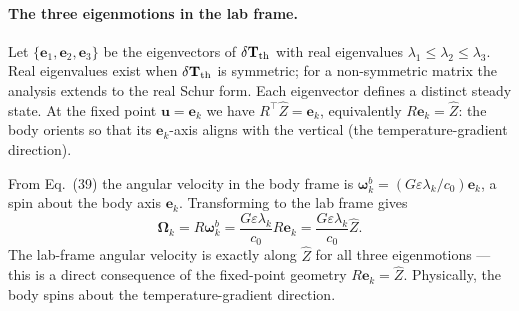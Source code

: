 \documentclass[11pt]{article}
\newcommand{\vect}[1]{\bm{#1}}
\newcommand{\T}{^{\!\top}}
\begin{document}
\paragraph{The three eigenmotions in the lab frame.} Let $\{\vect e_1,\vect e_2,\vect e_3\}$ be the eigenvectors of $\delta\mathbf T_{\rm th}$ with real eigenvalues $\lambda_1\le\lambda_2\le\lambda_3$. Real eigenvalues exist when $\delta\mathbf T_{\rm th}$ is symmetric; for a non-symmetric matrix the analysis extends to the real Schur form. Each eigenvector defines a distinct steady state. At the fixed point $\vect u=\vect e_k$ we have $R\T\hat Z=\vect e_k$, equivalently $R\vect e_k=\hat Z$: the body orients so that its $\vect e_k$-axis aligns with the vertical (the temperature-gradient direction).

From Eq.~(39) the angular velocity in the body frame is $\vect\omega^b_k=(G\varepsilon\lambda_k/c_0)\vect e_k$, a spin about the body axis $\vect e_k$. Transforming to the lab frame gives
\begin{equation}
  \vect\Omega_k=R\vect\omega^b_k=\frac{G\varepsilon\lambda_k}{c_0}R\vect e_k=\frac{G\varepsilon\lambda_k}{c_0}\hat Z.
\end{equation}
The lab-frame angular velocity is exactly along $\hat Z$ for all three eigenmotions --- this is a direct consequence of the fixed-point geometry $R\vect e_k=\hat Z$. Physically, the body spins about the temperature-gradient direction.
\end{document}
